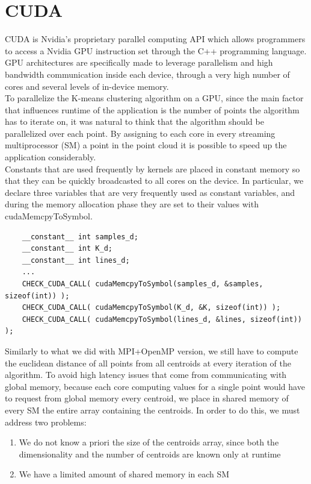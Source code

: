 \documentclass{article}
\begin{document}
\section*{CUDA}
CUDA is Nvidia's proprietary parallel computing API which allows programmers to access a Nvidia GPU instruction set through the C++ programming language. GPU architectures are specifically made to leverage parallelism and high bandwidth communication inside each device, through a very high number of cores and several levels of in-device memory.\\
To parallelize the K-means clustering algorithm on a GPU, since the main factor that influences runtime of the application is the number of points the algorithm has to iterate on, it was natural to think that the algorithm should be parallelized over each point. By assigning to each core in every streaming multiprocessor (SM) a point in the point cloud it is possible to speed up the application considerably.\\ 
Constants that are used frequently by kernels are placed in constant memory so that they can be quickly broadcasted to all cores on the device. In particular, we declare three variables that are very frequently used as constant variables, and during the memory allocation phase they are set to their values with cudaMemcpyToSymbol.
\begin{lstlisting}
    __constant__ int samples_d;
    __constant__ int K_d;
    __constant__ int lines_d;
    ...
    CHECK_CUDA_CALL( cudaMemcpyToSymbol(samples_d, &samples, sizeof(int)) );
    CHECK_CUDA_CALL( cudaMemcpyToSymbol(K_d, &K, sizeof(int)) );
    CHECK_CUDA_CALL( cudaMemcpyToSymbol(lines_d, &lines, sizeof(int)) );
\end{lstlisting}
Similarly to what we did with MPI+OpenMP version, we still have to compute the euclidean distance of all points from all centroids at every iteration of the algorithm. To avoid high latency issues that come from communicating with global memory, because each core computing values for a single point would have to request from global memory every centroid, we place in shared memory of every SM the entire array containing the centroids. In order to do this, we must address two problems:
\begin{enumerate}
    \item We do not know a priori the size of the centroids array, since both the dimensionality and the number of centroids are known only at runtime
    \item We have a limited amount of shared memory in each SM
\end{enumerate}
\end{document}
